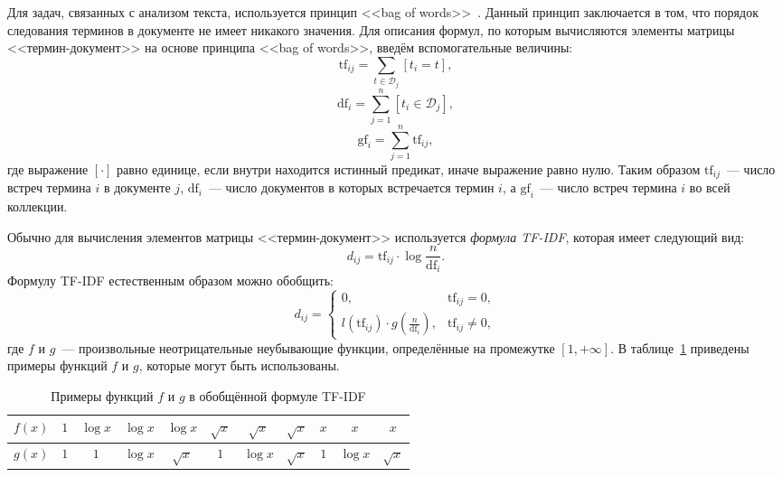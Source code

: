 Для задач, связанных с анализом текста, используется принцип
<<bag of words>>~\cite{manning2008introduction2}. Данный принцип
заключается в том, что порядок следования терминов в документе
не имеет никакого значения. Для описания формул, по которым вычисляются 
элементы матрицы <<термин-документ>> на основе принципа <<bag of words>>,
введём вспомогательные величины:
\[
    \mathrm{tf}_{ij} = \sum_{t \in \mathcal{D}_j} [t_i = t],
\]
\[
    \mathrm{df}_{i} = \sum_{j=1}^{n} [t_i \in \mathcal{D}_j],
\]
\[
    \mathrm{gf}_{i} = \sum_{j=1}^{n} \mathrm{tf}_{ij},
\]
где выражение $[\cdot]$ равно единице, если внутри находится истинный
предикат, иначе выражение равно нулю. Таким образом $\mathrm{tf}_{ij}$~---
число встреч термина $i$ в документе $j$, $\mathrm{df}_{i}$~---
число документов в которых встречается термин $i$, а $\mathrm{gf}_{i}$~---
число встреч термина $i$ во всей коллекции.

Обычно для вычисления элементов матрицы <<термин-документ>> используется
\textit{формула TF-IDF}, которая имеет следующий вид:
\begin{equation}\label{eq:tf_idf}
    d_{ij} = \mathrm{tf}_{ij} \cdot \log{\frac{n}{\mathrm{df}_{i}}}.
\end{equation}
Формулу TF-IDF естественным образом можно обобщить:
\begin{equation}\label{eq:general_tfidf}
d_{ij} = \begin{cases}
    0,& \mathrm{tf}_{ij} = 0,\\
    l(\mathrm{tf}_{ij}) \cdot g(\frac{n}{\mathrm{df}_{i}}),& \mathrm{tf}_{ij} \ne 0,
         \end{cases}
\end{equation}
где $f$ и $g$~--- произвольные неотрицательные неубывающие функции, определённые
на промежутке $\left[1, +\infty \right]$. В
таблице~\ref{tab:f_g_examples} приведены примеры функций $f$ и $g$,
которые могут быть использованы.

\begin{table}[!h]
    \caption{Примеры функций $f$ и $g$ в обобщённой формуле TF-IDF}\label{tab:f_g_examples}
\centering
\begin{tabular}{|c|c|c|c|c|c|c|c|c|c|c|}\hline
    \boldmath$f(x)$ & $1$ & $\log{x}$ & $\log{x}$ & $\log{x}$ & $\sqrt{x}$ & $\sqrt{x}$ & $\sqrt{x}$ & $x$ & $x$ & $x$ \\\hline
    \boldmath$g(x)$ & $1$ & $1$ & $\log{x}$ & $\sqrt{x}$ & $1$ & $\log{x}$ & $\sqrt{x}$ & $1$ & $\log{x}$ & $\sqrt{x}$ \\\hline
\end{tabular}
\end{table}

